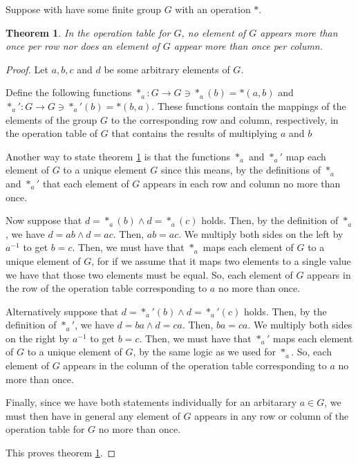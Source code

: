 \documentclass[12pt]{article}
\newtheorem{thm}{Theorem}
\begin{document}
Suppose with have some finite group $G$ with an operation $*$.

\begin{thm} \label{thm:12}
	In the operation table for $G$,
	no element of $G$ appears more than once per row
	nor does an element of $G$ appear more than once per column.
\end{thm}

\begin{proof}
	Let $a,b,c$ and $d$ be some arbitrary elements of $G$.

	Define the following functions
	$*_a:G \to G \ni *_a(b) = *(a,b)$
	and $*_a':G \to G \ni *_a'(b) = *(b, a)$.
	These functions contain the mappings
	of the elements of the group $G$
	to the corresponding row and column, respectively,
	in the operation table of $G$
	that contains the results of multiplying $a$ and $b$

	Another way to state theorem \ref{thm:12} is that
	the functions $*_a$ and $*_a'$
	map each element of $G$ to a unique element $G$
	since this means, by the definitions of $*_a$ and $*_a'$
	that each element of $G$ appears in each row and column
	no more than once.

	Now suppose that $d = *_a(b) \land d = *_a(c)$ holds.
	Then, by the definition of $*_a$,
	we have $d = ab \land d = ac$.
	Then, $ab = ac$.
	We multiply both sides on the left by $a^{-1}$
	to get $b = c$.
	Then, we must have that $*_a$ maps each element of $G$
	to a unique element of $G$,
	for if we assume that it maps two elements to a single value
	we have that those two elements must be equal.
	So, each element of $G$
	appears in the row of the operation table
	corresponding to $a$
	no more than once.

	Alternatively suppose that $d = *_a'(b) \land d = *_a'(c)$ holds.
	Then, by the definition of $*_a'$,
	we have $d = ba \land d = ca$.
	Then, $ba = ca$.
	We multiply both sides on the right by $a^{-1}$
	to get $b = c$.
	Then, we must have that $*_a'$ maps each element of $G$
	to a unique element of $G$,
	by the same logic as we used for $*_a$.
	So, each element of $G$
	appears in the column of the operation table
	corresponding to $a$
	no more than once.

	Finally, since we have both statements individually
	for an arbitarary $a \in G$,
	we must then have in general
	any element of $G$
	appears in any row or column
	of the operation table for $G$
	no more than once.
	
	This proves theorem \ref{thm:12}.

\end{proof}
\end{document}
